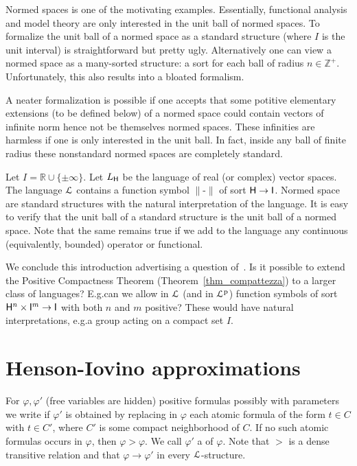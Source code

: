 \documentclass[10pt,oneside]{amsproc}
\renewcommand*{\emph}[1]{%
   \smash{\tikz[baseline]\node[rectangle, fill=teal!25, rounded corners, inner xsep=0.5ex, inner ysep=0.2ex, anchor=base, minimum height = 2.7ex]{\strut #1};}}
\begin{document}
Normed spaces is one of the motivating examples.
Essentially, functional analysis and model theory are only interested in the unit ball of normed spaces.
To formalize the unit ball of a normed space as a standard structure (where $I$ is the unit interval) is straightforward but pretty ugly.
Alternatively one can view a normed space as a many-sorted structure: a sort for each ball of radius $n\in\mathds{Z}^+$.
Unfortunately, this also results into a bloated formalism.

A neater formalization is possible if one accepts that some potitive elementary extensions (to be defined below) of a normed space could contain vectors of infinite norm hence not be themselves normed spaces.
These infinities are harmless if one is only interested in the unit ball.
In fact, inside any ball of finite radius these nonstandard normed spaces are completely standard.

\begin{example}\label{ex_normed_spaces}
Let $I=\mathds{R}\cup\{\pm\infty\}$.
Let $L_{\sf H}$ be the language of real (or complex) vector spaces.
The language ${\EuScript L}$ contains a function symbol $\|\mbox{-}\|$ of sort ${\sf H}\to {\sf I}$.
Normed space are standard structures with the natural interpretation of the language.
It is easy to verify that the unit ball of a standard structure is the unit ball of a normed space.
Note that the same remains true if we add to the language any continuous (equivalently, bounded) operator or functional.
\end{example}

We conclude this introduction advertising a question of~\cite{clcl}.
Is it possible to extend the Positive Compactness Theorem (Theorem~\ref{thm_compattezza}) to a larger class of languages?
E.g.\@ can we allow in ${\EuScript L}$ (and in ${\EuScript L}^{\rm p}$) function symbols of sort ${\sf H}^n\times {\sf I}^m\to {\sf I}$ with both $n$ and $m$ positive?
These would have natural interpretations, e.g.\@ a group acting on a compact set $I$.

\section{Henson-Iovino approximations}\label{ultrapws}

For $\varphi,\varphi'$ (free variables are hidden) positive formulas possibly with parameters we write \emph{$\varphi'>\varphi$\/} if $\varphi'$ is obtained by replacing in $\varphi$ each atomic formula of the form $t\in C$ with $t\in C'$, where $C'$ is some compact neighborhood of $C$.
If no such atomic formulas occurs in $\varphi$, then $\varphi>\varphi$.
We call $\varphi'$ a \emph{weakening\/} of $\varphi$.
Note that $>$ is a dense transitive relation and that  $\varphi\to\varphi'$ in every ${\EuScript L}$-structure.
\end{document}
